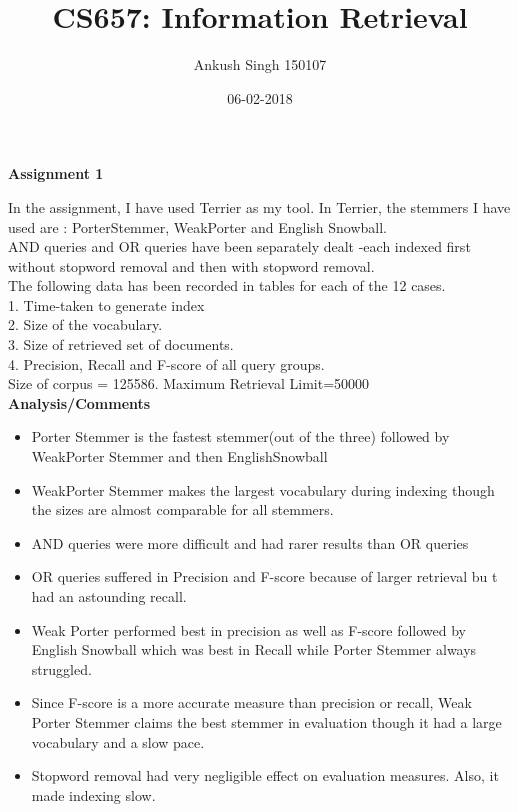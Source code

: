 \documentclass[a4paper, 10pt]{report}
\title{CS657: Information Retrieval }
\author{Ankush Singh {150107}}
\date{06-02-2018}
\begin{document}
\maketitle   
\begin{center}
\textbf{\Large Assignment 1}\\
\end{center}
\vspace{10pt}
 In the assignment, I have used Terrier as my tool.
 In Terrier, the stemmers I have used are : PorterStemmer, WeakPorter and English Snowball.
\vspace{10pt}\\
AND queries and OR queries have been separately dealt -each indexed first without stopword removal and then with stopword removal.\\
The following data has been recorded in tables for each of the 12 cases.\\
1. Time-taken to generate index\\
2. Size of the vocabulary.\\
3. Size of retrieved set of documents.\\
4. Precision, Recall and F-score of all query groups.\\

Size of corpus = 125586.     Maximum Retrieval Limit=50000\\
\textbf{Analysis/Comments}
\begin{itemize}
\item Porter Stemmer is the fastest stemmer(out of the three) followed by WeakPorter Stemmer and then EnglishSnowball 
\item WeakPorter Stemmer makes the largest vocabulary during indexing though the sizes are almost comparable for all stemmers.
\item AND queries were more difficult and had rarer results than OR queries
\item OR queries suffered in Precision and F-score because of larger retrieval bu t had an astounding recall.
\item Weak Porter performed best in precision as well as F-score followed by English Snowball which was best in Recall while Porter Stemmer always struggled.
\item Since F-score is a more accurate measure than precision or recall, Weak Porter Stemmer claims the best stemmer in evaluation though it had a large vocabulary and a slow pace.
\item Stopword removal had very negligible effect on evaluation measures. Also, it made indexing slow.
\end{itemize}
\end{document}
